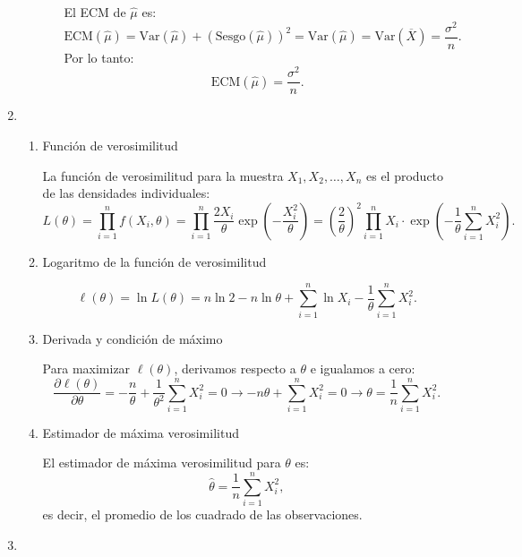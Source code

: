 \begin{enumerate}[label=\color{red}\textbf{\arabic*)}]
\begin{enumerate}[label=\arabic*)]
\begin{enumerate}[label=\alph*)]
                        El ECM de $\hat{\mu}$ es: \[
                        \mathrm{ECM}(\hat{\mu})=\mathrm{Var}(\hat{\mu})+(\mathrm{Sesgo}(\hat{\mu}))^2=\mathrm{Var}(\hat{\mu})=\mathrm{Var}(\overline{X})=\dfrac{\sigma^2}{n}.
                        \] 
                        Por lo tanto: \[
                        \mathrm{ECM}(\hat{\mu})=\dfrac{\sigma^2}{n}.
                        \] 
                \end{enumerate}
        \end{enumerate}
    \item {}

    \begin{enumerate}[label=\arabic*)]
        \item Función de verosimilitud

            La función de verosimilitud para la muestra $X_1,X_2,\dots,X_n$ es el producto de las densidades individuales: \[
            L(\theta)=\prod_{i=1}^{n} f(X_i,\theta)=\prod_{i=1}^{n} \dfrac{2X_i}{\theta}\exp\left( -\dfrac{X_i^2}{\theta} \right) =\left( \dfrac{2}{\theta} \right)^2 \prod_{i=1}^{n} X_i\cdot \exp\left( -\dfrac{1}{\theta}\sum_{i=1}^{n} X_i^2 \right)    . 
            \] 
        \item Logaritmo de la función de verosimilitud

            \[
                \ell(\theta)=\ln L(\theta)=n\ln 2-n\ln\theta+\sum_{i=1}^{n} \ln X_i-\dfrac{1}{\theta}\sum_{i=1}^{n} X_i^2.
            \] 
        \item Derivada y condición de máximo

            Para maximizar $\ell(\theta)$, derivamos respecto a $\theta$ e igualamos a cero: \[
            \frac{\partial \ell(\theta)}{\partial \theta}=-\dfrac{n}{\theta}+\dfrac{1}{\theta^2}\sum_{i=1}^{n} X_i^2=0\longrightarrow -n\theta+\sum_{i=1}^{n} X_i^2=0\longrightarrow \theta=\dfrac{1}{n}\sum_{i=1}^{n} X_i^2. 
            \] 
        \item Estimador de máxima verosimilitud

            El estimador de máxima verosimilitud para $\theta$ es: \[
            \hat{\theta}=\dfrac{1}{n}\sum_{i=1}^{n} X_i^2,
            \] 
            es decir, el promedio de los cuadrado de las observaciones.
    \end{enumerate}
\item {}


\end{enumerate}
